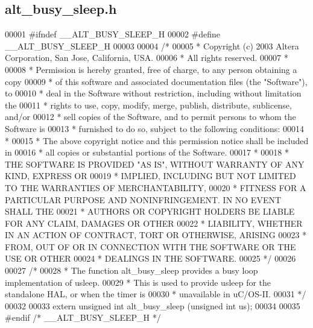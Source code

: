\subsection{alt\+\_\+busy\+\_\+sleep.\+h}
\label{alt__busy__sleep_8h_source}

\begin{DoxyCode}
00001 \textcolor{preprocessor}{#ifndef \_\_ALT\_BUSY\_SLEEP\_H}
00002 \textcolor{preprocessor}{#define \_\_ALT\_BUSY\_SLEEP\_H}
00003 
00004 \textcolor{comment}{/*}
00005 \textcolor{comment}{ * Copyright (c) 2003 Altera Corporation, San Jose, California, USA.  }
00006 \textcolor{comment}{ * All rights reserved.}
00007 \textcolor{comment}{ * }
00008 \textcolor{comment}{ * Permission is hereby granted, free of charge, to any person obtaining a copy}
00009 \textcolor{comment}{ * of this software and associated documentation files (the "Software"), to }
00010 \textcolor{comment}{ * deal in the Software without restriction, including without limitation the }
00011 \textcolor{comment}{ * rights to use, copy, modify, merge, publish, distribute, sublicense, and/or}
00012 \textcolor{comment}{ * sell copies of the Software, and to permit persons to whom the Software is }
00013 \textcolor{comment}{ * furnished to do so, subject to the following conditions:}
00014 \textcolor{comment}{ *}
00015 \textcolor{comment}{ * The above copyright notice and this permission notice shall be included in }
00016 \textcolor{comment}{ * all copies or substantial portions of the Software.}
00017 \textcolor{comment}{ * }
00018 \textcolor{comment}{ * THE SOFTWARE IS PROVIDED "AS IS", WITHOUT WARRANTY OF ANY KIND, EXPRESS OR }
00019 \textcolor{comment}{ * IMPLIED, INCLUDING BUT NOT LIMITED TO THE WARRANTIES OF MERCHANTABILITY, }
00020 \textcolor{comment}{ * FITNESS FOR A PARTICULAR PURPOSE AND NONINFRINGEMENT. IN NO EVENT SHALL THE}
00021 \textcolor{comment}{ * AUTHORS OR COPYRIGHT HOLDERS BE LIABLE FOR ANY CLAIM, DAMAGES OR OTHER }
00022 \textcolor{comment}{ * LIABILITY, WHETHER IN AN ACTION OF CONTRACT, TORT OR OTHERWISE, ARISING }
00023 \textcolor{comment}{ * FROM, OUT OF OR IN CONNECTION WITH THE SOFTWARE OR THE USE OR OTHER }
00024 \textcolor{comment}{ * DEALINGS IN THE SOFTWARE.}
00025 \textcolor{comment}{ */}
00026 
00027 \textcolor{comment}{/*}
00028 \textcolor{comment}{ * The function alt\_busy\_sleep provides a busy loop implementation of usleep.}
00029 \textcolor{comment}{ * This is used to provide usleep for the standalone HAL, or when the timer is}
00030 \textcolor{comment}{ * unavailable in uC/OS-II.}
00031 \textcolor{comment}{ */} 
00032 
00033 \textcolor{keyword}{extern} \textcolor{keywordtype}{unsigned} \textcolor{keywordtype}{int} alt_busy_sleep (\textcolor{keywordtype}{unsigned} \textcolor{keywordtype}{int} us);
00034 
00035 \textcolor{preprocessor}{#endif }\textcolor{comment}{/* \_\_ALT\_BUSY\_SLEEP\_H */}\textcolor{preprocessor}{}
\end{DoxyCode}
